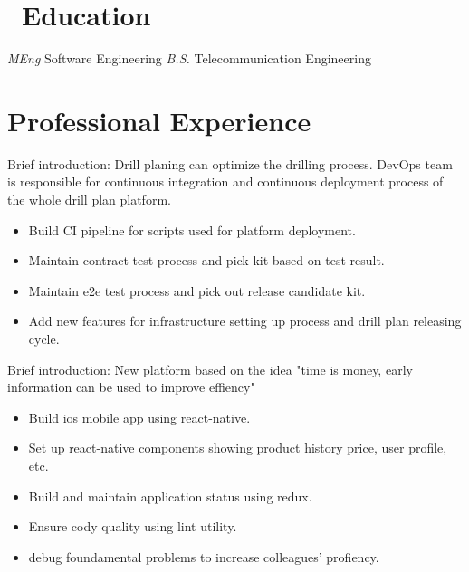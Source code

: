 \documentclass{resume}
\begin{document}



\section{\faGraduationCap\ Education}
\textit{MEng} Software Engineering
\textit{B.S.} Telecommunication Engineering

\section{Professional Experience}

Brief introduction: Drill planing can optimize the drilling process. DevOps team is responsible for continuous integration and continuous deployment process of the whole drill plan platform. 
\begin{itemize}
  \item Build CI pipeline for scripts used for platform deployment.
  \item Maintain contract test process and pick kit based on test result.
  \item Maintain e2e test process and pick out release candidate kit.
  \item Add new features for infrastructure setting up process and drill plan releasing cycle.
\end{itemize}

Brief introduction: New platform based on the idea "time is money, early information can be used to improve effiency" 
\begin{itemize}
  \item Build ios mobile app using react-native. 
  \item Set up react-native components showing product history price, user profile, etc.
  \item Build and maintain application status using redux.
  \item Ensure cody quality using lint utility.
  \item debug foundamental problems to increase colleagues' profiency.
\end{itemize}
\end{document}
